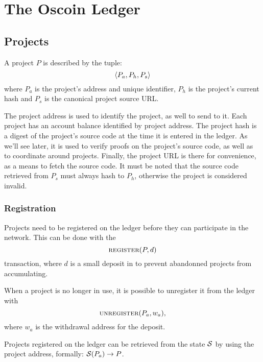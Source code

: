 \section{The Oscoin Ledger}

\subsection{Projects}
\label{s:projects}

A project $P$ is described by the tuple:
\[
    \langle P_{a}, P_h, P_s\rangle
\]
where $P_{a}$ is the project's address and unique identifier, $P_h$ is
the project's current hash and $P_s$ is the canonical project source URL.

The project address is used to identify the project, as well to send
\oscoin{} to it. Each project has an account balance identified by project
address. The project hash is a digest of the project's source code at the time
it is entered in the ledger. As we'll see later, it is used to verify proofs
on the project's source code, as well as to coordinate around projects. Finally,
the project URL is there for convenience, as a means to fetch the source code.
It must be noted that the source code retrieved from $P_s$ must always hash to
$P_h$, otherwise the project is considered invalid.

\subsubsection{Registration} Projects need to be registered on the ledger
before they can participate in the network. This can be done with the
\[
    \text{\normalfont\scshape register}\small{\lparen P, d\rparen}
\]
transaction, where $d$ is a small deposit in \oscoin{} to prevent abandonned
projects from accumulating.

When a project is no longer in use, it is possible to unregister it from the
ledger with
\[
    \text{\normalfont\scshape unregister}\small{\lparen P_a, w_a\rparen},
\]
where $w_a$ is the withdrawal address for the deposit.

Projects registered on the ledger can be retrieved from the state $\mathcal{S}$ by
using the project address, formally: $\mathcal{S}(P_a) \to P$.

